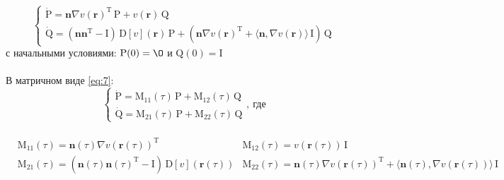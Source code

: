 \documentclass{article}
\newcommand{\bfv}[1]{\mathbf{#1}}
\newcommand{\dd}[1]{\dot{#1}}
\newcommand{\dv}[1]{\nabla v(#1)}
\newcommand{\ddv}[1]{\mathrm{D}[v](#1)}
\newcommand{\dprod}[2]{\langle #1, #2 \rangle}
\newcommand{\T}[1]{#1^\mathrm{T}}
\newcommand{\matr}[1]{\mathrm{#1}}
\begin{document}
\begin{equation} \label{eq:7}
\begin{cases}
\dd{\matr{P}} = \bfv{n}\T{\dv{\bfv{r}}}\,\matr{P} + v(\bfv{r})\,\matr{Q}\\
\dd{\matr{Q}} = (\bfv{n}\T{\bfv{n}} - \matr{I})\,\ddv{\bfv{r}}\,\matr{P} + (\bfv{n}\T{\dv{\bfv{r}}} + \dprod{\bfv{n}}{\dv{\bfv{r}}}\,\matr{I})\,\matr{Q} 
\end{cases}
\end{equation}
с начальными условиями: $\matr{P}(0) = \matr{\O}$ и $\matr{Q}(0) = \matr{I}$\\\\
\newpage
В матричном виде \eqref{eq:7}:
\begin{equation} \label{eq:8}
\begin{cases}
\dd{\matr{P}} = \matr{M}_{11}(\tau)\,\matr{P} + \matr{M}_{12}(\tau)\,\matr{Q}\\
\dd{\matr{Q}} = \matr{M}_{21}(\tau)\,\matr{P} + \matr{M}_{22}(\tau)\,\matr{Q} 
\end{cases}, \ \text{где}
\end{equation}\\
\begin{align*} 
&\matr{M}_{11}(\tau) = \bfv{n}(\tau)\T{\dv{\bfv{r}(\tau)}}&\matr{M}_{12}(\tau) = v(\bfv{r}(\tau))\,\matr{I}\\
&\matr{M}_{21}(\tau) = (\bfv{n}(\tau)\T{\bfv{n}(\tau)} - \matr{I})\,\ddv{\bfv{r}(\tau)}&\matr{M}_{22}(\tau) = \bfv{n}(\tau)\T{\dv{\bfv{r}(\tau)}} + \dprod{\bfv{n}(\tau)}{\dv{\bfv{r}(\tau)}}\,\matr{I}
\end{align*}
\end{document}
